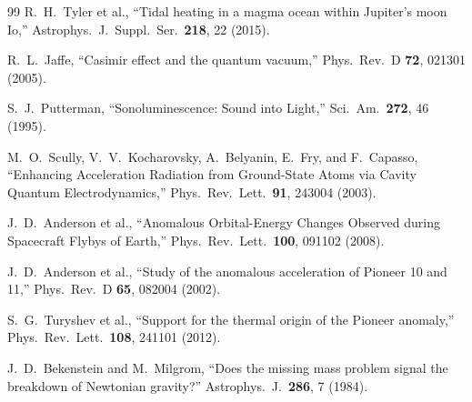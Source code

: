 \documentclass[aps,prd,twocolumn,showpacs,preprintnumbers,superscriptaddress,nofootinbib]{revtex4-2}
\begin{document}
\begin{thebibliography}{99}
R.~H.~Tyler et al., ``Tidal heating in a magma ocean within Jupiter's
moon Io,'' Astrophys.\ J.\ Suppl.\ Ser.\ \textbf{218}, 22 (2015).

R.~L.~Jaffe, ``Casimir effect and the quantum vacuum,'' Phys.\ Rev.\ D
\textbf{72}, 021301 (2005).

S.~J.~Putterman, ``Sonoluminescence: Sound into Light,'' Sci.\ Am.\
\textbf{272}, 46 (1995).

M.~O.~Scully, V.~V.~Kocharovsky, A.~Belyanin, E.~Fry, and
F.~Capasso, ``Enhancing Acceleration Radiation from Ground-State Atoms
via Cavity Quantum Electrodynamics,'' Phys.\ Rev.\ Lett.\ \textbf{91},
243004 (2003).

J.~D.~Anderson et al., ``Anomalous Orbital-Energy Changes Observed
during Spacecraft Flybys of Earth,'' Phys.\ Rev.\ Lett.\ \textbf{100},
091102 (2008).

J.~D.~Anderson et al., ``Study of the anomalous acceleration of Pioneer
10 and 11,'' Phys.\ Rev.\ D \textbf{65}, 082004 (2002).

S.~G.~Turyshev et al., ``Support for the thermal origin of the Pioneer
anomaly,'' Phys.\ Rev.\ Lett.\ \textbf{108}, 241101 (2012).

J.~D.~Bekenstein and M.~Milgrom, ``Does the missing mass problem signal
the breakdown of Newtonian gravity?'' Astrophys.\ J.\ \textbf{286}, 7
(1984).

\end{thebibliography}
\end{document}
